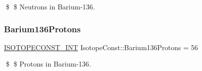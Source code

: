 \$ \$ Neutrons in Barium-\/136. \mbox{\label{group___isotope_const-_barium-_ba136_ga65a9df2bdef9649c95465ae2739fdb09}} 
\subsubsection{\texorpdfstring{Barium136\+Protons}{Barium136Protons}}
{\footnotesize\ttfamily \mbox{\hyperlink{group___isotope_const-_macros_ga5f18360b3e99483a35c32d789e62621c}{I\+S\+O\+T\+O\+P\+E\+C\+O\+N\+S\+T\+\_\+\+I\+NT}} Isotope\+Const\+::\+Barium136\+Protons = 56}

\$ \$ Protons in Barium-\/136. 